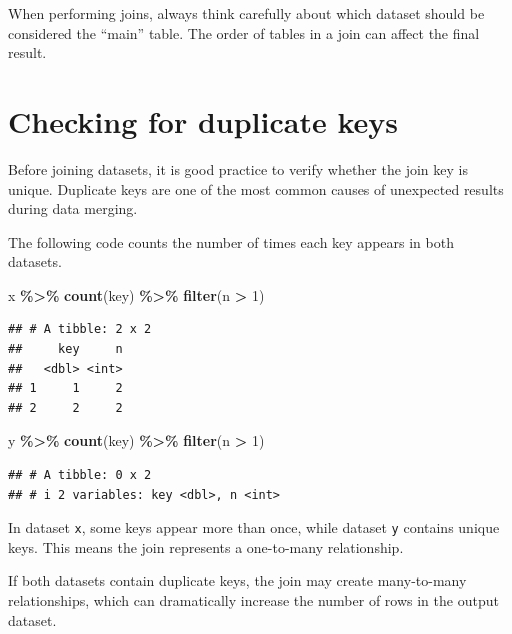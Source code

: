 \documentclass[
  11pt,
  oneside]{book}
\newenvironment{Shaded}{\begin{snugshade}}{\end{snugshade}}
\newcommand{\DecValTok}[1]{\textcolor[rgb]{0.00,0.00,0.81}{#1}}
\newcommand{\FunctionTok}[1]{\textcolor[rgb]{0.13,0.29,0.53}{\textbf{#1}}}
\newcommand{\NormalTok}[1]{#1}
\newcommand{\SpecialCharTok}[1]{\textcolor[rgb]{0.81,0.36,0.00}{\textbf{#1}}}
\begin{document}
When performing joins, always think carefully about which dataset should be considered the ``main'' table. The order of tables in a join can affect the final result.

\section{Checking for duplicate keys}\label{checking-for-duplicate-keys}

Before joining datasets, it is good practice to verify whether the join key is unique. Duplicate keys are one of the most common causes of unexpected results during data merging.

The following code counts the number of times each key appears in both datasets.

\begin{Shaded}
\begin{Highlighting}[]
\NormalTok{x }\SpecialCharTok{\%\textgreater{}\%}
  \FunctionTok{count}\NormalTok{(key) }\SpecialCharTok{\%\textgreater{}\%}
  \FunctionTok{filter}\NormalTok{(n }\SpecialCharTok{\textgreater{}} \DecValTok{1}\NormalTok{)}
\end{Highlighting}
\end{Shaded}

\begin{verbatim}
## # A tibble: 2 x 2
##     key     n
##   <dbl> <int>
## 1     1     2
## 2     2     2
\end{verbatim}

\begin{Shaded}
\begin{Highlighting}[]
\NormalTok{y }\SpecialCharTok{\%\textgreater{}\%}
  \FunctionTok{count}\NormalTok{(key) }\SpecialCharTok{\%\textgreater{}\%}
  \FunctionTok{filter}\NormalTok{(n }\SpecialCharTok{\textgreater{}} \DecValTok{1}\NormalTok{)}
\end{Highlighting}
\end{Shaded}

\begin{verbatim}
## # A tibble: 0 x 2
## # i 2 variables: key <dbl>, n <int>
\end{verbatim}

In dataset \texttt{x}, some keys appear more than once, while dataset \texttt{y} contains unique keys. This means the join represents a one-to-many relationship.

If both datasets contain duplicate keys, the join may create many-to-many relationships, which can dramatically increase the number of rows in the output dataset.
\end{document}
